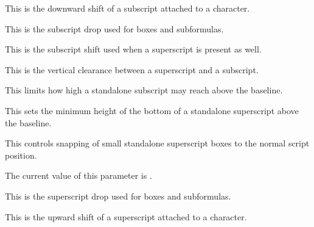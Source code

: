 \stopnewprimitive

\startnewprimitive[title={\prm {Umathsubshiftdown}}]

This is the downward shift of a subscript attached to a character.

\stopnewprimitive

\startnewprimitive[title={\prm {Umathsubshiftdrop}}]

This is the subscript drop used for boxes and subformulas.

\stopnewprimitive

\startnewprimitive[title={\prm {Umathsubsupshiftdown}}]

This is the subscript shift used when a superscript is present as well.

\stopnewprimitive

\startnewprimitive[title={\prm {Umathsubsupvgap}}]

This is the vertical clearance between a superscript and a subscript.

\stopnewprimitive

\startnewprimitive[title={\prm {Umathsubtopmax}}]

This limits how high a standalone subscript may reach above the baseline.

\stopnewprimitive

\startnewprimitive[title={\prm {Umathsupbottommin}}]

This sets the minimum height of the bottom of a standalone superscript above the
baseline.

\stopnewprimitive

\startnewprimitive[title={\prm {Umathsuperscriptsnap}}]

This controls snapping of small standalone superscript boxes to the normal script
position.

\stopnewprimitive

\startnewprimitive[title={\prm {Umathsuperscriptvariant}}]

The current value of this parameter is \CurrentMathVariant
\Umathsuperscriptvariant.

\stopnewprimitive

\startnewprimitive[title={\prm {Umathsupshiftdrop}}]

This is the superscript drop used for boxes and subformulas.

\stopnewprimitive

\startnewprimitive[title={\prm {Umathsupshiftup}}]

This is the upward shift of a superscript attached to a character.

